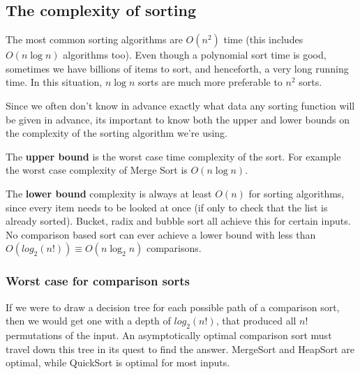 \subsection{The complexity of sorting}

The most common sorting algorithms are $O(n^2)$ time (this includes $O(n
\log{n})$ algorithms too). Even though a polynomial sort time is good, sometimes
we have billions of items to sort, and henceforth, a very long running time. In
this situation, $n \log{n}$ sorts are much more preferable to $n^2$ sorts.

Since we often don't know in advance exactly what data any sorting function will
be given in advance, its important to know both the upper and lower bounds on
the complexity of the sorting algorithm we're using.

\begin{description}
  \item The \textbf{upper bound} is the worst case time complexity of the
  sort. For example the worst case complexity of Merge Sort is $O(n \log{n})$.

  \item The \textbf{lower bound} complexity is always at least $O(n)$ for
  sorting algorithms, since every item needs to be looked at once (if only to
  check that the list is already sorted). Bucket, radix and bubble sort all
  achieve this for certain inputs. No comparison based sort can ever achieve
  a lower bound with less than $O(log_2(n!)) \equiv O(n\log_2{n})$ comparisons.
\end{description}

\subsubsection{Worst case for comparison sorts}

If we were to draw a decision tree for each possible path of a comparison sort,
then we would get one with a depth of $log_2(n!)$, that produced all $n!$
permutations of the input. An asymptotically optimal comparison sort must travel
down this tree in its quest to find the answer. MergeSort and HeapSort are
optimal, while QuickSort is optimal for most inputs.

